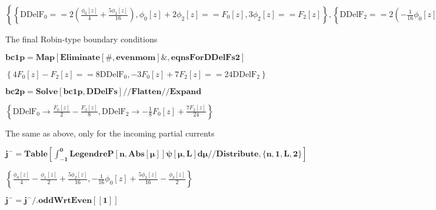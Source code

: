 \documentclass{article}
\begin{document}
\begin{doublespace}
\noindent\(\left\{\left\{\text{DDelF}_0==2 \left(\frac{\phi _0[z]}{4}+\frac{5 \phi _2[z]}{16}\right),\phi _0[z]+2 \phi _2[z]==F_0[z],3 \phi _2[z]==F_2[z]\right\},\left\{\text{DDelF}_2==2
\left(-\frac{1}{16} \phi _0[z]+\frac{5 \phi _2[z]}{16}\right),\phi _0[z]+2 \phi _2[z]==F_0[z],3 \phi _2[z]==F_2[z]\right\}\right\}\)
\end{doublespace}

The final Robin-type boundary conditions 

\begin{doublespace}
\noindent\(\pmb{\text{bc1p}=\text{Map}[\text{Eliminate}[\#,\text{evenmom}]\&,\text{eqnsForDDelFs2}]}\)
\end{doublespace}

\begin{doublespace}
\noindent\(\left\{4 F_0[z]-F_2[z]==8 \text{DDelF}_0,-3 F_0[z]+7 F_2[z]==24 \text{DDelF}_2\right\}\)
\end{doublespace}

\begin{doublespace}
\noindent\(\pmb{\text{bc2p}=\text{Solve}[\text{bc1p},\text{DDelFs}]\text{//}\text{Flatten}\text{//}\text{Expand}}\)
\end{doublespace}

\begin{doublespace}
\noindent\(\left\{\text{DDelF}_0\to \frac{F_0[z]}{2}-\frac{F_2[z]}{8},\text{DDelF}_2\to -\frac{1}{8} F_0[z]+\frac{7 F_2[z]}{24}\right\}\)
\end{doublespace}

The same as above, only for the incoming partial currents

\begin{doublespace}
\noindent\(\pmb{j^-=\text{Table}\left[\int _{-1}^0\text{LegendreP}[n,\text{Abs}[\mu ]]\psi [\mu ,L]d\mu \text{//}\text{Distribute},\{n,1,L,2\}\right]}\)
\end{doublespace}

\begin{doublespace}
\noindent\(\left\{\frac{\phi _0[z]}{4}-\frac{\phi _1[z]}{2}+\frac{5 \phi _2[z]}{16},-\frac{1}{16} \phi _0[z]+\frac{5 \phi _2[z]}{16}-\frac{\phi _3[z]}{2}\right\}\)
\end{doublespace}

\begin{doublespace}
\noindent\(\pmb{j^-=j^-\text{/.}\text{oddWrtEven}[[1]]}\)
\end{doublespace}
\end{document}
